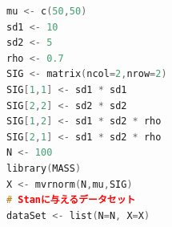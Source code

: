 \begin{lstlisting}[language=c++,label={code:22_03},caption={対応ある二群の仮想データ}]
mu <- c(50,50)
sd1 <- 10
sd2 <- 5
rho <- 0.7
SIG <- matrix(ncol=2,nrow=2)
SIG[1,1] <- sd1 * sd1
SIG[2,2] <- sd2 * sd2
SIG[1,2] <- sd1 * sd2 * rho
SIG[2,1] <- sd1 * sd2 * rho
N <- 100
library(MASS)
X <- mvrnorm(N,mu,SIG)
# Stanに与えるデータセット
dataSet <- list(N=N, X=X)
\end{lstlisting}
